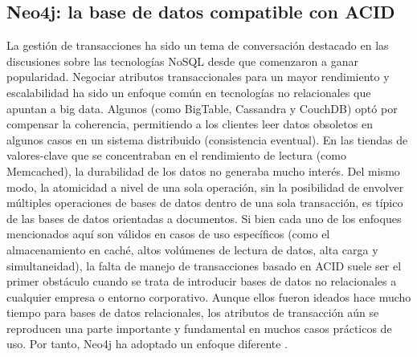 \subsection{Neo4j: la base de datos compatible con ACID}
La gestión de transacciones ha sido un tema de conversación destacado en las discusiones sobre las tecnologías NoSQL desde que comenzaron a ganar popularidad. Negociar atributos transaccionales para un mayor rendimiento y escalabilidad ha sido un enfoque común en tecnologías no relacionales que apuntan a big data. Algunos (como BigTable, Cassandra y CouchDB) optó por compensar la coherencia, permitiendo a los clientes leer datos obsoletos en algunos casos en un sistema distribuido (consistencia eventual). En las tiendas de valores-clave que se concentraban en el rendimiento de lectura (como Memcached), la durabilidad de los datos no generaba mucho interés. Del mismo modo, la atomicidad a nivel de una sola operación, sin la posibilidad de
envolver múltiples operaciones de bases de datos dentro de una sola transacción, es típico de las bases de datos orientadas a documentos.
Si bien cada uno de los enfoques mencionados aquí son válidos en casos de uso específicos (como el almacenamiento en caché, altos volúmenes de lectura de datos, alta carga y simultaneidad), la falta de manejo de transacciones basado en ACID suele ser el primer obstáculo cuando se trata de introducir bases de datos no relacionales a cualquier empresa o entorno corporativo. Aunque ellos
fueron ideados hace mucho tiempo para bases de datos relacionales, los atributos de transacción aún se reproducen una parte importante y fundamental en muchos casos prácticos de uso. Por tanto, Neo4j ha adoptado un enfoque diferente \cite{vukotic2015neo4j}.

